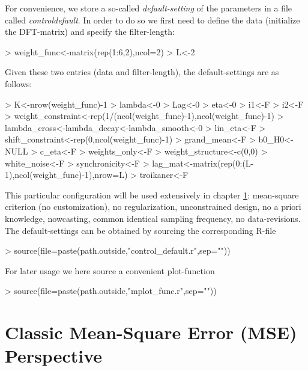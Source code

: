 \documentclass[a4paper]{book}
\begin{document}
For convenience, we store a so-called \emph{default-setting} of the parameters in a file called \emph{control\textunderscore default}. In order to do so we first need to define the data (initialize the DFT-matrix) and specify the filter-length:
\begin{Schunk}
\begin{Sinput}
> weight_func<-matrix(rep(1:6,2),ncol=2)
> L<-2
\end{Sinput}
\end{Schunk}
Given these two entries (data and filter-length), the default-settings are as follows:
\begin{Schunk}
\begin{Sinput}
> K<-nrow(weight_func)-1
> lambda<-0
> Lag<-0
> eta<-0
> i1<-F
> i2<-F
> weight_constraint<-rep(1/(ncol(weight_func)-1),ncol(weight_func)-1)
> lambda_cross<-lambda_decay<-lambda_smooth<-0
> lin_eta<-F
> shift_constraint<-rep(0,ncol(weight_func)-1)
> grand_mean<-F
> b0_H0<-NULL
> c_eta<-F
> weights_only<-F
> weight_structure<-c(0,0)
> white_noise<-F
> synchronicity<-F
> lag_mat<-matrix(rep(0:(L-1),ncol(weight_func)-1),nrow=L)
> troikaner<-F
\end{Sinput}
\end{Schunk}
This particular configuration will be used extensively in chapter \ref{mse_sec}: mean-square criterion (no customization), no regularization, unconstrained design, no a priori knowledge, nowcasting, common identical sampling frequency, no data-revisions. The default-settings can be obtained by sourcing the corresponding R-file

\begin{Schunk}
\begin{Sinput}
> source(file=paste(path.outside,"control_default.r",sep=""))
\end{Sinput}
\end{Schunk}
For later usage we here source a convenient plot-function
\begin{Schunk}
\begin{Sinput}
> source(file=paste(path.outside,"mplot_func.r",sep=""))
\end{Sinput}
\end{Schunk}







\chapter{Classic Mean-Square Error (MSE) Perspective}\label{mse_sec}
\end{document}
